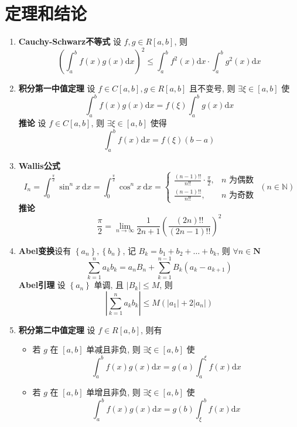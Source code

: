 \documentclass{article}
\begin{document}
	\section{定理和结论}
		\begin{enumerate}
			\item \textbf{Cauchy-Schwarz不等式} 设 $f, g \in R[a, b]$, 则
			$$
			\left(\int_{a}^{b} f(x) g(x) \mathrm{d} x\right)^{2} \leq \int_{a}^{b} f^{2}(x) \mathrm{d} x \cdot \int_{a}^{b} g^{2}(x) \mathrm{d} x
			$$
			\item \textbf{积分第一中值定理}
			设 $f \in C[a, b], g \in R[a, b]$ 且不变号, 则 $\exists \xi \in[a, b]$ 使
			$$
			\int_{a}^{b} f(x) g(x) \mathrm{d} x=f(\xi) \int_{a}^{b} g(x) \mathrm{d} x
			$$
			\textbf{推论} 设 $f \in C[a, b]$, 则 $\exists \xi \in[a, b]$ 使得
			$$
			\int_{a}^{b} f(x) \mathrm{d} x=f(\xi)(b-a)
			$$
			\item \textbf{Wallis公式}
			$$
			I_{n}=\int_{0}^{\frac{\pi}{2}} \sin ^{n} x \mathrm{~d} x=\int_{0}^{\frac{\pi}{2}} \cos ^{n} x \mathrm{~d} x=\left\{\begin{array}{ll}
				\frac{(n-1) ! !}{n ! !} \cdot \frac{\pi}{2}, & n \text { 为偶数 } \\
				\frac{(n-1) ! !}{n ! !}, & n \text { 为奇数 }
			\end{array}(n \in \mathbb{N})\right.
			$$
			\textbf{推论}
			$$
			\frac{\pi}{2}=\lim _{n \rightarrow \infty} \frac{1}{2 n+1}\left(\frac{(2 n) ! !}{(2 n-1) ! !}\right)^{2}
			$$
			\item \textbf{Abel变换}设有 $\left\{a_{n}\right\}, \left\{b_{n}\right\}$, 记 $B_{k}=b_{1}+b_{2}+\ldots+b_{k}$, 则 $\forall n \in \mathbf{N}$
			$$
			\sum_{k=1}^{n} a_{k} b_{k}=a_{n} B_{n}+\sum_{k=1}^{n-1} B_{k}\left(a_{k}-a_{k+1}\right)
			$$
			\textbf{Abel引理} 设 $\left\{a_{n}\right\}$ 单调, 且 $\left|B_{k}\right| \leq M$, 则$$
			\left|\sum_{k=1}^{n} a_{k} b_{k}\right| \leq M\left(\left|a_{1}\right|+2\left|a_{n}\right|\right)
			$$
			\item \textbf{积分第二中值定理}
			设 $f \in R[a, b]$, 则有
			\begin{itemize}
				\subsubsection*{Bonnet型}
				\item 若 $g$ 在 $[a, b]$ 单减且非负, 则 $\exists \xi \in[a, b]$ 使
				$$
				\int_{a}^{b} f(x) g(x) \mathrm{d} x=g(a) \int_{a}^{\xi} f(x) \mathrm{d} x
				$$
				\item 若 $g$ 在 $[a, b]$ 单增且非负, 则 $\exists \xi \in[a, b]$ 使
				$$
				\int_{a}^{b} f(x) g(x) \mathrm{d} x=g(b) \int_{\xi}^{b} f(x) \mathrm{d} x
				$$

\end{itemize}
\end{enumerate}
\end{document}
